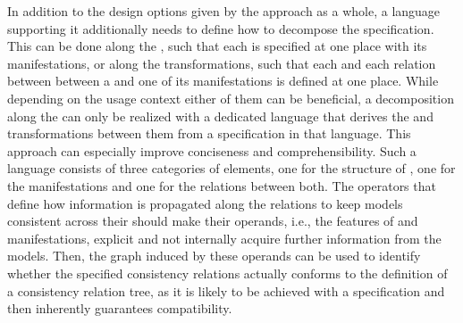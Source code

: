 \begin{insight}[Language]
    In addition to the design options given by the \commonalities approach as a whole, a language supporting it additionally needs to define how to decompose the specification.
    This can be done along the \commonalities, such that each \commonality is specified at one place with its manifestations, or along the transformations, such that each \conceptmetamodel and each relation between between a \conceptmetamodel and one of its manifestations is defined at one place.
    While depending on the usage context either of them can be beneficial, a decomposition along the \commonalities can only be realized with a dedicated language that derives the \conceptmetamodels and transformations between them from a specification in that language. This approach can especially improve conciseness and comprehensibility.
    Such a language consists of three categories of elements, one for the structure of \conceptmetamodels, one for the manifestations and one for the relations between both.
    The operators that define how information is propagated along the relations to keep models consistent across their \commonalities should make their operands, i.e., the features of \commonalities and manifestations, explicit and not internally acquire further information from the models.
    Then, the graph induced by these operands can be used to identify whether the specified consistency relations actually conforms to the definition of a consistency relation tree, as it is likely to be achieved with a \commonalities specification and then inherently guarantees compatibility.
\end{insight}

